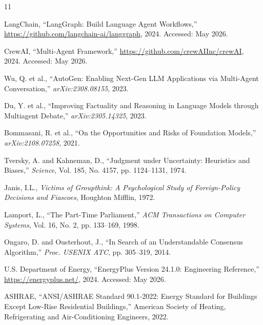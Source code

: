 \documentclass[11pt,a4paper]{article}
\begin{document}
\begin{thebibliography}{11}

LangChain, ``LangGraph: Build Language Agent Workflows,'' \url{https://github.com/langchain-ai/langgraph}, 2024. Accessed: May 2026.

CrewAI, ``Multi-Agent Framework,'' \url{https://github.com/crewAIInc/crewAI}, 2024. Accessed: May 2026.

Wu, Q. et al., ``AutoGen: Enabling Next-Gen LLM Applications via Multi-Agent Conversation,'' \textit{arXiv:2308.08155}, 2023.

Du, Y. et al., ``Improving Factuality and Reasoning in Language Models through Multiagent Debate,'' \textit{arXiv:2305.14325}, 2023.

Bommasani, R. et al., ``On the Opportunities and Risks of Foundation Models,'' \textit{arXiv:2108.07258}, 2021.

Tversky, A. and Kahneman, D., ``Judgment under Uncertainty: Heuristics and Biases,'' \textit{Science}, Vol. 185, No. 4157, pp. 1124--1131, 1974.

Janis, I.L., \textit{Victims of Groupthink: A Psychological Study of Foreign-Policy Decisions and Fiascoes}, Houghton Mifflin, 1972.

Lamport, L., ``The Part-Time Parliament,'' \textit{ACM Transactions on Computer Systems}, Vol. 16, No. 2, pp. 133--169, 1998.

Ongaro, D. and Ousterhout, J., ``In Search of an Understandable Consensus Algorithm,'' \textit{Proc. USENIX ATC}, pp. 305--319, 2014.

U.S. Department of Energy, ``EnergyPlus Version 24.1.0: Engineering Reference,'' \url{https://energyplus.net/}, 2024. Accessed: May 2026.

ASHRAE, ``ANSI/ASHRAE Standard 90.1-2022: Energy Standard for Buildings Except Low-Rise Residential Buildings,'' American Society of Heating, Refrigerating and Air-Conditioning Engineers, 2022.

\end{thebibliography}
\end{document}
